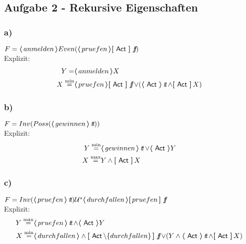 \subsection*{Aufgabe 2 - Rekursive Eigenschaften}

\subsubsection*{a)}

$ F = \poss{anmelden} Even( \poss{pruefen} \necess{\Act} \false)$ \\

Explizit: \\

\begin{align*}
Y =& \poss{anmelden} X \\
X \HMmin& \poss{pruefen}\necess{ \Act } \false \lor (\poss{ \Act } \true \land \necess { \Act } X )
\end{align*}


\subsubsection*{b)}

$ F = Inv(Poss(\poss{gewinnen} \true))$ \\

Explizit: \\

\begin{align*}
Y \HMmin& \poss{gewinnen} \true \lor \poss{ \Act } Y \\
X \HMmax& Y \land \necess{ \Act } X
\end{align*}

\subsubsection*{c)}

$ F = Inv(\poss{pruefen} \true) \mathcal{U}^s \poss{durchfallen} \necess{pruefen} \false$ \\

Explizit: \\

\begin{align*}
Y \HMmax& \poss{pruefen} \true \land \poss{ \Act } Y \\
X \HMmin& \poss{durchfallen} \land \necess{\Act  \setminus \{durchfallen\}} \false \lor
(Y \land \poss{\Act} \true \land \necess{\Act}X)
\end{align*}

